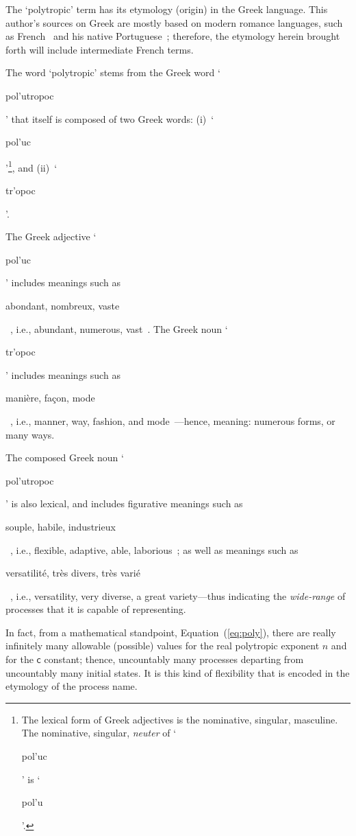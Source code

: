 \documentclass[fleqn,11pt]{SelfArx}
\newcommand{\GRtxt}[1]{\begin{otherlanguage}{greek}{{#1}}\end{otherlanguage}}
\newcommand{\FRtxt}[1]{\begin{otherlanguage}{french}{{#1}}\end{otherlanguage}}
\begin{document}
    The `polytropic' term has its etymology  (origin)  in  the  Greek  language.  This  author's
    sources   on   Greek   are   mostly   based   on   modern   romance   languages,   such   as
    French~\cite{1968-Chantraine-Klincksieck,    2000-BaillyA-Hachette}    and    his     native
    Portuguese~\cite{1997-ManiatoglouMPF-Porto}; therefore, the etymology herein  brought  forth
    will include intermediate French terms.

    The word `polytropic' stems from the  Greek  word  `\GRtxt{pol'u\-tropoc}'  that  itself  is
    composed of two Greek  words:  (i)~`\GRtxt{po\-l'uc}'\footnote{The  lexical  form  of  Greek
    adjectives is the nominative, singular, masculine. The nominative,  singular,  \emph{neuter}
    of `\GRtxt{pol'uc}' is `\GRtxt{pol'u}'.}, and (ii)~`\GRtxt{tr'opoc}'.

    The  Greek  adjective  `\GRtxt{pol'uc}'  includes  meanings  such  as  \FRtxt{\og  abondant,
    nombreux,   vaste   \fg}~\cite{1968-Chantraine-Klincksieck},   i.e.,   abundant,   numerous,
    vast~\cite{2009-BarrierMA+ViviesC-Auzou,  2011-SilvaASM-WMFMartinsFontes}.  The  Greek  noun
    `\GRtxt{tr'opoc}'   includes   meanings   such   as   \FRtxt{\og   manière,   façon,    mode
    \fg}~\cite{2000-BaillyA-Hachette},      i.e.,      manner,      way,      fashion,       and
    mode~\cite{2009-BarrierMA+ViviesC-Auzou,  2011-SilvaASM-WMFMartinsFontes}---hence,  meaning:
    numerous forms, or many ways.

    The composed Greek noun `\GRtxt{pol'utropoc}'  is  also  lexical,  and  includes  figurative
    meanings such as \FRtxt{\og souple, habile,  industrieux  \fg}~\cite{2000-BaillyA-Hachette},
    i.e., flexible, adaptive, able, laborious~\cite{2011-SilvaASM-WMFMartinsFontes}; as well  as
    meanings    such    as    \FRtxt{\og    versatilité,     très     divers,     très     varié
    \fg}~\cite{2000-BaillyA-Hachette}, i.e., versatility, very diverse, a  great  variety---thus
    indicating the \emph{wide-range} of processes that it is capable of representing.

    In  fact,  from  a  mathematical  standpoint,  Equation~(\ref{eq:poly}),  there  are  really
    infinitely many allowable (possible) values for the real polytropic exponent $n$ and for the
    $\mathsf{c}$ constant; thence, uncountably many processes departing  from  uncountably  many
    initial states. It is this kind of flexibility that is  encoded  in  the  etymology  of  the
    process name.

\end{document}
